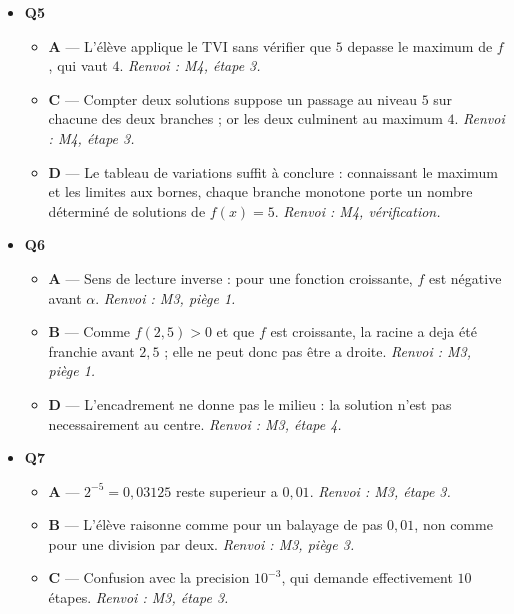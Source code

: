 \begin{itemize}
\begin{itemize}
    \item \textbf{C} — L'élève conclut trop vite parce que $f$ n'est pas monotone sur l'intervalle entier. \emph{Renvoi : M4, étape 1.}
    \item \textbf{D} — Il n'y a que deux branches monotones, donc au plus deux solutions. \emph{Renvoi : M4, vérification.}
  \end{itemize}
  \item \textbf{Q5}
  \begin{itemize}
    \item \textbf{A} — L'élève applique le TVI sans vérifier que $5$ depasse le maximum de $f$, qui vaut $4$. \emph{Renvoi : M4, étape 3.}
    \item \textbf{C} — Compter deux solutions suppose un passage au niveau $5$ sur chacune des deux branches ; or les deux culminent au maximum $4$. \emph{Renvoi : M4, étape 3.}
    \item \textbf{D} — Le tableau de variations suffit à conclure : connaissant le maximum et les limites aux bornes, chaque branche monotone porte un nombre déterminé de solutions de $f(x)=5$. \emph{Renvoi : M4, vérification.}
  \end{itemize}
  \item \textbf{Q6}
  \begin{itemize}
    \item \textbf{A} — Sens de lecture inverse : pour une fonction croissante, $f$ est négative avant $\alpha$. \emph{Renvoi : M3, piège 1.}
    \item \textbf{B} — Comme $f(2{,}5)>0$ et que $f$ est croissante, la racine a deja été franchie avant $2{,}5$ ; elle ne peut donc pas être a droite. \emph{Renvoi : M3, piège 1.}
    \item \textbf{D} — L'encadrement ne donne pas le milieu : la solution n'est pas necessairement au centre. \emph{Renvoi : M3, étape 4.}
  \end{itemize}
  \item \textbf{Q7}
  \begin{itemize}
    \item \textbf{A} — $2^{-5} = 0{,}03125$ reste superieur a $0{,}01$. \emph{Renvoi : M3, étape 3.}
    \item \textbf{B} — L'élève raisonne comme pour un balayage de pas $0{,}01$, non comme pour une division par deux. \emph{Renvoi : M3, piège 3.}
    \item \textbf{C} — Confusion avec la precision $10^{-3}$, qui demande effectivement $10$ étapes. \emph{Renvoi : M3, étape 3.}

\end{itemize}
\end{itemize}

